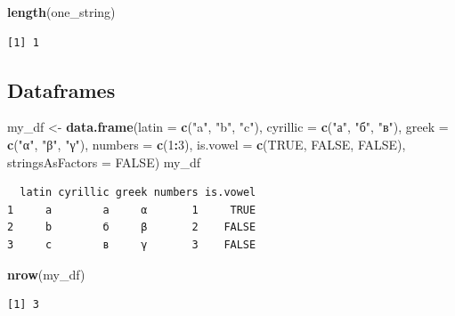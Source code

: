 \documentclass[]{book}
\newenvironment{Shaded}{\begin{snugshade}}{\end{snugshade}}
\newcommand{\KeywordTok}[1]{\textcolor[rgb]{0.13,0.29,0.53}{\textbf{#1}}}
\newcommand{\DataTypeTok}[1]{\textcolor[rgb]{0.13,0.29,0.53}{#1}}
\newcommand{\DecValTok}[1]{\textcolor[rgb]{0.00,0.00,0.81}{#1}}
\newcommand{\StringTok}[1]{\textcolor[rgb]{0.31,0.60,0.02}{#1}}
\newcommand{\OtherTok}[1]{\textcolor[rgb]{0.56,0.35,0.01}{#1}}
\newcommand{\OperatorTok}[1]{\textcolor[rgb]{0.81,0.36,0.00}{\textbf{#1}}}
\newcommand{\NormalTok}[1]{#1}
\theoremstyle{definition}
\theoremstyle{definition}
\theoremstyle{definition}
\theoremstyle{remark}
\begin{document}
\begin{Shaded}
\begin{Highlighting}[]
\KeywordTok{length}\NormalTok{(one_string)}
\end{Highlighting}
\end{Shaded}

\begin{verbatim}
[1] 1
\end{verbatim}

\subsection{Dataframes}\label{dataframes}

\begin{Shaded}
\begin{Highlighting}[]
\NormalTok{my_df <-}\StringTok{ }\KeywordTok{data.frame}\NormalTok{(}\DataTypeTok{latin =} \KeywordTok{c}\NormalTok{(}\StringTok{"a"}\NormalTok{, }\StringTok{"b"}\NormalTok{, }\StringTok{"c"}\NormalTok{),}
                    \DataTypeTok{cyrillic =} \KeywordTok{c}\NormalTok{(}\StringTok{"а"}\NormalTok{, }\StringTok{"б"}\NormalTok{, }\StringTok{"в"}\NormalTok{),}
                    \DataTypeTok{greek =} \KeywordTok{c}\NormalTok{(}\StringTok{"α"}\NormalTok{, }\StringTok{"β"}\NormalTok{, }\StringTok{"γ"}\NormalTok{),}
                    \DataTypeTok{numbers =} \KeywordTok{c}\NormalTok{(}\DecValTok{1}\OperatorTok{:}\DecValTok{3}\NormalTok{),}
                    \DataTypeTok{is.vowel =} \KeywordTok{c}\NormalTok{(}\OtherTok{TRUE}\NormalTok{, }\OtherTok{FALSE}\NormalTok{, }\OtherTok{FALSE}\NormalTok{),}
                    \DataTypeTok{stringsAsFactors =} \OtherTok{FALSE}\NormalTok{)}
\NormalTok{my_df}
\end{Highlighting}
\end{Shaded}

\begin{verbatim}
  latin cyrillic greek numbers is.vowel
1     a        а     α       1     TRUE
2     b        б     β       2    FALSE
3     c        в     γ       3    FALSE
\end{verbatim}

\begin{Shaded}
\begin{Highlighting}[]
\KeywordTok{nrow}\NormalTok{(my_df)}
\end{Highlighting}
\end{Shaded}

\begin{verbatim}
[1] 3
\end{verbatim}
\end{document}
